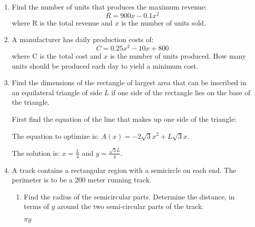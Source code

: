 \documentclass{exam}
\begin{document}
\begin{enumerate}

  \pagebreak

  \item 
    Find the number of units that produces the maximum revenue:
    \[
      R = 900x - 0.1x^2
    \]
    where R is the total revenue and $x$ is the number of units sold.

  \item
    A manufacturer has daily production costs of:
    \[
      C =  0.25x^2 - 10x + 800 
    \]
    where C is the total cost and $x$ is the number of units produced.  How many units should be produced each day to
    yield a minimum cost.

  \item Find the dimensions of the rectangle of largest area that can be inscribed in an equilateral triangle of side
    $L$ if one side of the rectangle lies on the base of the triangle.

    \begin{solution}
      First find the equation of the line that makes up one side of the triangle:

      The equation to optimize is: $A(x) = -2 \sqrt{3} x^2 + L\sqrt{3}x$.

      The solution is: $x = \frac{L}{4}$ and $y = \frac{\sqrt{3} L}{4}$.
    \end{solution}

  \pagebreak

  \item 
    A track contains a rectangular region with a semicircle on each end.  The perimeter is to be a 200 meter running
    track.

    \begin{enumerate}[a]
      \item Find the radius of the semicircular parts.  Determine the distance, in terms of $y$ around the two
        semi-circular parts of the track.

        \begin{solution}
          $\pi y$
        \end{solution}


\end{enumerate}
\end{enumerate}
\end{document}
